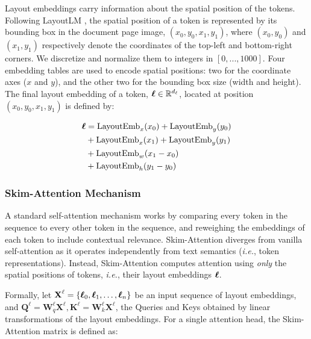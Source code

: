 Layout embeddings carry information about the spatial position of the tokens. Following LayoutLM \citep{xu2020layoutlm}, the spatial position of a token is represented by its bounding box in the document page image, $(x_0, y_0, x_1, y_1)$, where $(x_0, y_0)$ and $(x_1, y_1)$ respectively denote the coordinates of the top-left and bottom-right corners. We discretize and normalize them to integers in $[0, ..., 1000]$. Four embedding tables are used to encode spatial positions: two for the coordinate axes ($x$ and $y$), and the other two for the bounding box size (width and height). The final layout embedding of a token, $\boldsymbol{\ell} \in \mathbb{R}^{d_{\ell}}$, located at position $(x_0, y_0, x_1, y_1)$ is defined by:
\vspace{-0.5cm}

\begin{equation}
\begin{split}
    \boldsymbol{\ell} & = \text{LayoutEmb}_x(x_0) + \text{LayoutEmb}_y(y_0) \\
    & + \text{LayoutEmb}_x(x_1) + \text{LayoutEmb}_y(y_1) \\
    & + \text{LayoutEmb}_w(x_1 - x_0) \\
    & + \text{LayoutEmb}_h(y_1 - y_0) \\
\end{split}
\end{equation}

\subsubsection{Skim-Attention Mechanism}

A standard self-attention mechanism works by comparing every token in the sequence to every other token in the sequence, and reweighing the embeddings of each token to include contextual relevance. Skim-Attention diverges from vanilla self-attention as it operates independently from text semantics (\textit{i.e.}, token representations). Instead, Skim-Attention computes attention using \emph{only} the spatial positions of tokens, \textit{i.e.}, their layout embeddings $\boldsymbol{\ell}$.

Formally, let $\textbf{X}^{\ell} =  \{\boldsymbol{\ell}_0, \boldsymbol{\ell}_1, \ldots, \boldsymbol{\ell}_n\}$ be an input sequence of layout embeddings, and $\textbf{Q}^{\ell} = \textbf{W}^{\ell}_q \textbf{X}^{\ell}, \textbf{K}^{\ell} =  \textbf{W}^{\ell}_k \textbf{X}^{\ell}$, the Queries and Keys obtained by linear transformations of the layout embeddings. For a single attention head, the Skim-Attention matrix is defined as:

